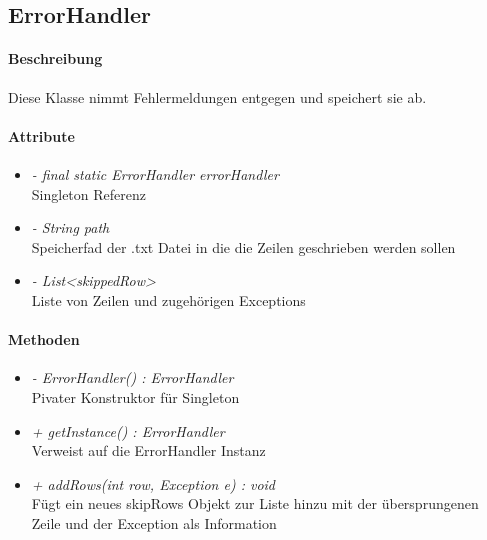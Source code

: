 \subsection{ErrorHandler}

\paragraph{Beschreibung}
Diese Klasse nimmt Fehlermeldungen entgegen und speichert sie ab.

\paragraph{Attribute}
\begin{itemize}
\item \textit{ - final static ErrorHandler errorHandler}
\\ Singleton Referenz
\item \textit{ - String path}
\\ Speicherfad der .txt Datei in die die Zeilen geschrieben werden sollen
\item \textit{ - List<skippedRow>}
\\ Liste von Zeilen und zugehörigen Exceptions
\end{itemize}

\paragraph{Methoden}

\begin{itemize}
\item \textit{ - ErrorHandler() : ErrorHandler}  \\Pivater Konstruktor für Singleton
\item \textit{ + getInstance() : ErrorHandler} \\Verweist auf die ErrorHandler Instanz
\item \textit{ + addRows(int row, Exception e) : void}
\\Fügt ein neues skipRows Objekt zur Liste hinzu mit der übersprungenen Zeile und der Exception als Information 

\end{itemize}